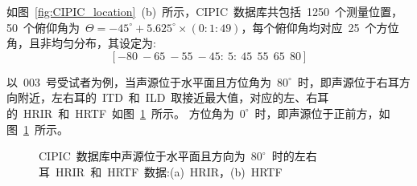 如图~\ref{fig:CIPIC_location}~(b)~所示，CIPIC~数据库共包括~1250~个测量位置，50~个俯仰角为~$\varTheta = -45^{\circ}+5.625^{\circ}\times (0:1:49)$，每个俯仰角均对应~25~个方位角，且非均匀分布，其设定为:
\begin{equation*}
\left[-80~-65~-55~-45:~5:~45~~55~~65~~80\right]
\end{equation*}


以~003~号受试者为例，当声源位于水平面且方位角为~$80^{\circ}$~时，即声源位于右耳方向附近，左右耳的~ITD~和~ILD~取接近最大值，对应的左、右耳的~HRIR~和~HRTF~如图~\ref{fig:CIPIC_80du}~所示。
方位角为~$0^{\circ}$~时，即声源位于正前方，如图~\ref{fig:CIPIC_80du}~所示。

\begin{figure}[H]
\centering
{}
\hfill
{}
\caption{CIPIC~数据库中声源位于水平面且方向为~$80^{\circ}$~时的左右耳~HRIR~和~HRTF~数据:(a)~HRIR，(b)~HRTF}
\label{fig:CIPIC_80du}
\end{figure}


